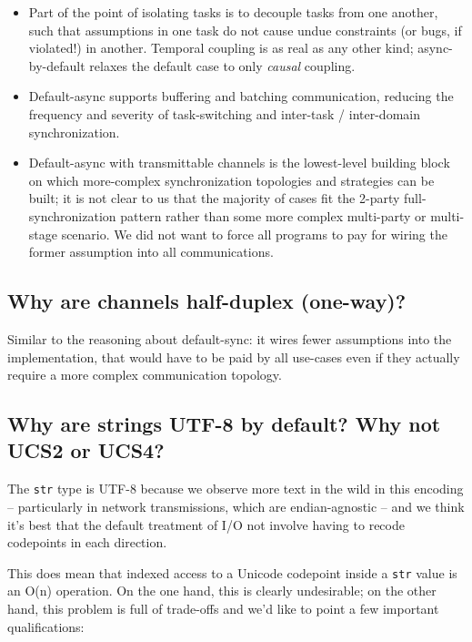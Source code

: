 \documentclass[]{article}
\begin{document}
\begin{itemize}
\itemsep1pt\parskip0pt
\item
  Part of the point of isolating tasks is to decouple tasks from one
  another, such that assumptions in one task do not cause undue
  constraints (or bugs, if violated!) in another. Temporal coupling is
  as real as any other kind; async-by-default relaxes the default case
  to only \emph{causal} coupling.
\item
  Default-async supports buffering and batching communication, reducing
  the frequency and severity of task-switching and inter-task /
  inter-domain synchronization.
\item
  Default-async with transmittable channels is the lowest-level building
  block on which more-complex synchronization topologies and strategies
  can be built; it is not clear to us that the majority of cases fit the
  2-party full-synchronization pattern rather than some more complex
  multi-party or multi-stage scenario. We did not want to force all
  programs to pay for wiring the former assumption into all
  communications.
\end{itemize}

\subsection{Why are channels half-duplex
(one-way)?}\label{why-are-channels-half-duplex-one-way}

Similar to the reasoning about default-sync: it wires fewer assumptions
into the implementation, that would have to be paid by all use-cases
even if they actually require a more complex communication topology.

\subsection{Why are strings UTF-8 by default? Why not UCS2 or
UCS4?}\label{why-are-strings-utf-8-by-default-why-not-ucs2-or-ucs4}

The \texttt{str} type is UTF-8 because we observe more text in the wild
in this encoding -- particularly in network transmissions, which are
endian-agnostic -- and we think it's best that the default treatment of
I/O not involve having to recode codepoints in each direction.

This does mean that indexed access to a Unicode codepoint inside a
\texttt{str} value is an O(n) operation. On the one hand, this is
clearly undesirable; on the other hand, this problem is full of
trade-offs and we'd like to point a few important qualifications:
\end{document}
